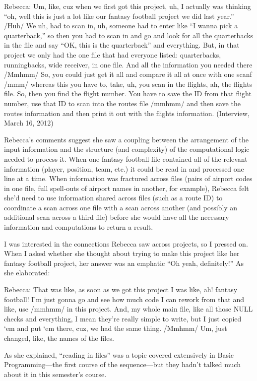 Rebecca: Um, like, cuz when we first got this project, uh, I actually
was thinking ``oh, well this is just a lot like our fantasy football
project we did last year.'' /Huh/ We uh, had to scan in, uh, someone had
to enter like ``I wanna pick a quarterback,'' so then you had to scan in
and go and look for all the quarterbacks in the file and say ``OK, this
is the quarterback'' and everything. But, in that project we only had
the one file that had everyone listed: quarterbacks, runningbacks, wide
receiver, in one file. And all the information you needed there /Mmhmm/
So, you could just get it all and compare it all at once with one scanf
/mmm/ whereas this you have to, take, uh, you scan in the flights, ah,
the flights file. So, then you find the flight number. You have to save
the ID from that flight number, use that ID to scan into the routes file
/mmhmm/ and then save the routes information and then print it out with
the flights information. (Interview, March 16, 2012)

Rebecca's comments suggest she saw a coupling between the arrangement of
the input information and the structure (and complexity) of the
computational logic needed to process it. When one fantasy football file
contained all of the relevant information (player, position, team, etc.)
it could be read in and processed one line at a time. When information
was fractured across files (pairs of airport codes in one file, full
spell-outs of airport names in another, for example), Rebecca felt she'd
need to use information shared across files (such as a route ID) to
coordinate a scan across one file with a scan across another (and
possibly an additional scan across a third file) before she would have
all the necessary information and computations to return a result.

I was interested in the connections Rebecca saw across projects, so I
pressed on. When I asked whether she thought about trying to make this
project like her fantasy football project, her answer was an emphatic
``Oh yeah, definitely!'' As she elaborated:

Rebecca: That was like, as soon as we got this project I was like, ah!
fantasy football! I'm just gonna go and see how much code I can rework
from that and like, use /mmhmm/ in this project. And, my whole main
file, like all those NULL checks and everything, I mean they're really
simple to write, but I just copied `em and put `em there, cuz, we had
the same thing. /Mmhmm/ Um, just changed, like, the names of the files.

As she explained, ``reading in files'' was a topic covered extensively
in Basic Programming---the first course of the sequence---but they
hadn't talked much about it in this semester's course.

